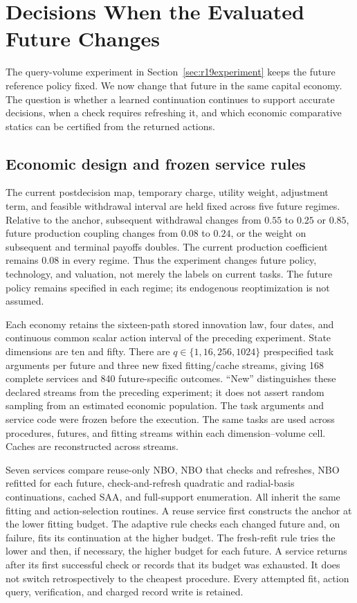 \section{Decisions When the Evaluated Future Changes}\label{sec:r21future}
The query-volume experiment in Section~\ref{sec:r19experiment} keeps the
future reference policy fixed. We now change that future in the same capital
economy. The question is whether a learned continuation continues to support
accurate decisions, when a check requires refreshing it, and which economic
comparative statics can be certified from the returned actions.

\subsection{Economic design and frozen service rules}
The current postdecision map, temporary charge, utility weight, adjustment
term, and feasible withdrawal interval are held fixed across five future
regimes. Relative to the anchor, subsequent withdrawal changes from $0.55$
to $0.25$ or $0.85$, future production coupling changes from $0.08$ to $0.24$,
or the weight on subsequent and terminal payoffs doubles. The current
production coefficient remains $0.08$ in every regime. Thus the experiment
changes future policy, technology, and valuation, not merely the labels on
current tasks. The future policy remains specified in each regime; its
endogenous reoptimization is not assumed.

Each economy retains the sixteen-path stored innovation law, four dates, and
continuous common scalar action interval of the preceding experiment. State
dimensions are ten and fifty. There are $q\in\{1,16,256,1024\}$ prespecified task arguments per future and three new fixed fitting/cache
streams, giving 168 complete services and 840 future-specific outcomes.
``New'' distinguishes these declared streams from the preceding experiment;
it does not assert random sampling from an estimated economic population.
The task arguments and service code were frozen before the execution. The
same tasks are used across procedures, futures, and fitting streams within
each dimension--volume cell. Caches are reconstructed across streams.

Seven services compare reuse-only NBO, NBO that checks and refreshes, NBO
refitted for each future, check-and-refresh quadratic and radial-basis
continuations, cached SAA, and full-support enumeration. All inherit the same
fitting and action-selection routines. A reuse service first constructs the
anchor at the lower fitting budget. The adaptive rule checks each changed
future and, on failure, fits its continuation at the higher budget. The
fresh-refit rule tries the lower and then, if necessary, the higher budget
for each future. A service returns after its first successful check or
records that its budget was exhausted. It does not switch retrospectively
to the cheapest procedure. Every attempted fit, action query, verification,
and charged record write is retained.

